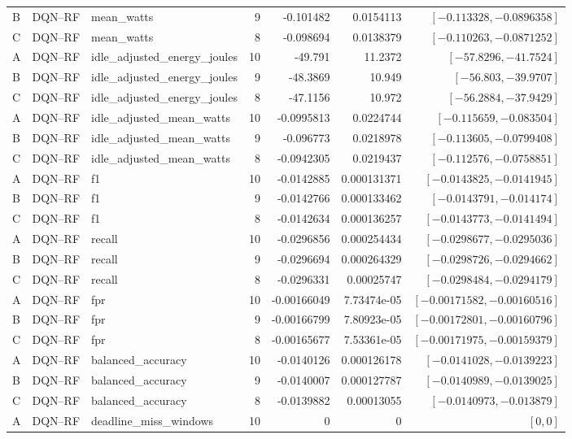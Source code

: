 \begin{longtable}{lllrrrr}
B & DQN--RF & mean\_watts & 9 & -0.101482 & 0.0154113 & $[-0.113328,-0.0896358]$\\
C & DQN--RF & mean\_watts & 8 & -0.098694 & 0.0138379 & $[-0.110263,-0.0871252]$\\
A & DQN--RF & idle\_adjusted\_energy\_joules & 10 & -49.791 & 11.2372 & $[-57.8296,-41.7524]$\\
B & DQN--RF & idle\_adjusted\_energy\_joules & 9 & -48.3869 & 10.949 & $[-56.803,-39.9707]$\\
C & DQN--RF & idle\_adjusted\_energy\_joules & 8 & -47.1156 & 10.972 & $[-56.2884,-37.9429]$\\
A & DQN--RF & idle\_adjusted\_mean\_watts & 10 & -0.0995813 & 0.0224744 & $[-0.115659,-0.083504]$\\
B & DQN--RF & idle\_adjusted\_mean\_watts & 9 & -0.096773 & 0.0218978 & $[-0.113605,-0.0799408]$\\
C & DQN--RF & idle\_adjusted\_mean\_watts & 8 & -0.0942305 & 0.0219437 & $[-0.112576,-0.0758851]$\\
A & DQN--RF & f1 & 10 & -0.0142885 & 0.000131371 & $[-0.0143825,-0.0141945]$\\
B & DQN--RF & f1 & 9 & -0.0142766 & 0.000133462 & $[-0.0143791,-0.014174]$\\
C & DQN--RF & f1 & 8 & -0.0142634 & 0.000136257 & $[-0.0143773,-0.0141494]$\\
A & DQN--RF & recall & 10 & -0.0296856 & 0.000254434 & $[-0.0298677,-0.0295036]$\\
B & DQN--RF & recall & 9 & -0.0296694 & 0.000264329 & $[-0.0298726,-0.0294662]$\\
C & DQN--RF & recall & 8 & -0.0296331 & 0.00025747 & $[-0.0298484,-0.0294179]$\\
A & DQN--RF & fpr & 10 & -0.00166049 & 7.73474e-05 & $[-0.00171582,-0.00160516]$\\
B & DQN--RF & fpr & 9 & -0.00166799 & 7.80923e-05 & $[-0.00172801,-0.00160796]$\\
C & DQN--RF & fpr & 8 & -0.00165677 & 7.53361e-05 & $[-0.00171975,-0.00159379]$\\
A & DQN--RF & balanced\_accuracy & 10 & -0.0140126 & 0.000126178 & $[-0.0141028,-0.0139223]$\\
B & DQN--RF & balanced\_accuracy & 9 & -0.0140007 & 0.000127787 & $[-0.0140989,-0.0139025]$\\
C & DQN--RF & balanced\_accuracy & 8 & -0.0139882 & 0.00013055 & $[-0.0140973,-0.013879]$\\
A & DQN--RF & deadline\_miss\_windows & 10 & 0 & 0 & $[0,0]$\\

\end{longtable}
